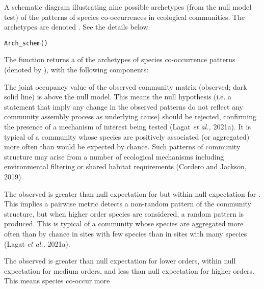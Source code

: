 \documentclass[a4paper]{book}
\begin{document}
%
\begin{Description}\relax
A schematic diagram illustrating nine possible archetypes (from the null model test) of the
patterns of species co-occurrences in ecological communities. The archetypes are denoted
. See the details below.
\end{Description}
%
\begin{Usage}
\begin{verbatim}
Arch_schem()
\end{verbatim}
\end{Usage}
%
\begin{Value}
The  function returns a  of the archetypes of species
co-occurrence patterns (denoted by ), with the following components:
\begin{ldescription}
\item[\code{\strong{Archetype}}] 
\item[\code{A1}] The joint occupancy value of the observed community matrix (observed; dark solid line) is above the null
model. This means the null hypothesis (i.e. a statement that imply any change in the observed patterns do
not reflect any community assembly process as underlying cause) should be rejected, confirming the presence of a
mechanism of interest being tested (Lagat \emph{et al.,} 2021a). It is typical of a community whose
species are positively associated (or aggregated) more often than would be expected by chance.
Such patterns of community structure may arise from a number of ecological mechanisms
including environmental filtering or shared habitat requirements (Cordero and Jackson,
2019).
\item[\code{A2}] The observed is greater than null expectation for  but within null expectation
for . This implies a pairwise metric detects a non-random pattern of the community
structure, but when higher order species are considered, a random pattern is produced. This is
typical of a community whose species are aggregated more often than by chance in sites with few
species than in sites with many species (Lagat \emph{et al.,} 2021a).
\item[\code{A3}] The observed is greater than null expectation for lower orders, within null expectation for
medium orders, and less than null expectation for higher orders. This means species co-occur more

\end{ldescription}
\end{Value}
\end{document}
